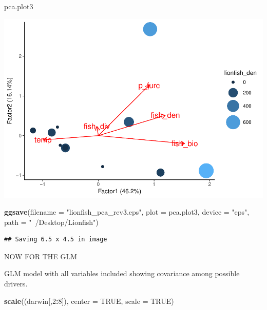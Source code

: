 \documentclass[]{article}
\newenvironment{Shaded}{\begin{snugshade}}{\end{snugshade}}
\newcommand{\KeywordTok}[1]{\textcolor[rgb]{0.13,0.29,0.53}{\textbf{#1}}}
\newcommand{\DataTypeTok}[1]{\textcolor[rgb]{0.13,0.29,0.53}{#1}}
\newcommand{\DecValTok}[1]{\textcolor[rgb]{0.00,0.00,0.81}{#1}}
\newcommand{\StringTok}[1]{\textcolor[rgb]{0.31,0.60,0.02}{#1}}
\newcommand{\OtherTok}[1]{\textcolor[rgb]{0.56,0.35,0.01}{#1}}
\newcommand{\OperatorTok}[1]{\textcolor[rgb]{0.81,0.36,0.00}{\textbf{#1}}}
\newcommand{\NormalTok}[1]{#1}
\begin{document}
\begin{Shaded}
\begin{Highlighting}[]
\NormalTok{pca.plot3}
\end{Highlighting}
\end{Shaded}

\includegraphics{darwin_GLM_final_files/figure-latex/unnamed-chunk-9-1.pdf}

\begin{Shaded}
\begin{Highlighting}[]
\KeywordTok{ggsave}\NormalTok{(}\DataTypeTok{filename =} \StringTok{"lionfish_pca_rev3.eps"}\NormalTok{, }\DataTypeTok{plot =}\NormalTok{ pca.plot3, }\DataTypeTok{device =} \StringTok{"eps"}\NormalTok{, }\DataTypeTok{path =} \StringTok{"~/Desktop/Lionfish"}\NormalTok{)}
\end{Highlighting}
\end{Shaded}

\begin{verbatim}
## Saving 6.5 x 4.5 in image
\end{verbatim}

NOW FOR THE GLM

GLM model with all variables included showing covariance among possible
drivers.

\begin{Shaded}
\begin{Highlighting}[]
\KeywordTok{scale}\NormalTok{((darwin[,}\DecValTok{2}\OperatorTok{:}\DecValTok{8}\NormalTok{]), }\DataTypeTok{center =} \OtherTok{TRUE}\NormalTok{, }\DataTypeTok{scale =} \OtherTok{TRUE}\NormalTok{)}
\end{Highlighting}
\end{Shaded}
\end{document}
